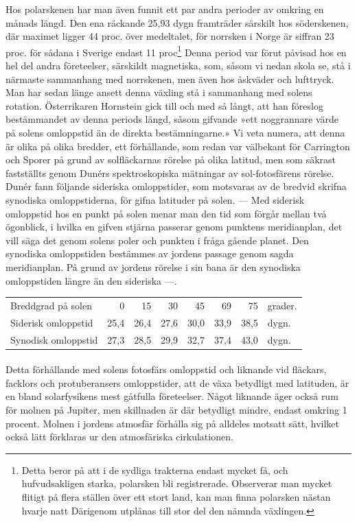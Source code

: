 \documentclass[a4paper, 12pt, oneside, swedish]{article}
\begin{document}
Hos polarskenen har man även funnit ett par andra perioder av omkring en månads längd. Den ena räckande 25,93 dygn framträder särskilt hos söderskenen, där maximet ligger 44 proc. över medeltalet, för norrsken i Norge är siffran 23 proc. för sådana i Sverige endast 11 proc\footnote{Detta beror på att i de sydliga trakterna endast mycket få, och hufvudsakligen starka, polarsken bli registrerade. Observerar man mycket flitigt på flera ställen över ett stort land, kan man finna polarsken nästan hvarje natt Därigenom utplånas till stor del den nämnda växlingen.} Denna period var förut påvisad hos en hel del andra företeelser, särskildt magnetiska, som, såsom vi nedan skola se, stå i närmaste sammanhang med norrskenen, men även hos åskväder och lufttryck. Man har sedan länge ansett denna växling stå i sammanhang med solens rotation. Österrikaren Hornstein gick till och med så långt, att han föreslog bestämmandet av denna periods längd, såsom gifvande »ett noggrannare värde på solens omloppstid än de direkta bestämningarne.» Vi veta numera, att denna är olika på olika bredder, ett förhållande, som redan var välbekant för Carrington och Sporer på grund av solfläckarnas rörelse på olika latitud, men som säkrast fastställts genom Dunérs spektroskopiska mätningar av sol-fotosfärens rörelse. Dunér fann följande sideriska omloppstider, som motsvaras av de bredvid skrifna synodiska omloppstiderna, för gifna latituder på solen. --- Med siderisk omloppstid hos en punkt på solen menar man den tid som förgår mellan två ögonblick, i hvilka en gifven stjärna passerar genom punktens meridianplan, det vill säga det genom solens poler och punkten i fråga gående planet. Den synodiska omloppstiden bestämmes av jordens passage genom sagda meridianplan. På grund av jordens rörelse i sin bana är den synodiska omloppstiden längre än den sideriska ---.

\begin{table}[H]
    \centering
    \footnotesize
    \Fontauri
    \begin{tabular}{l r r r r r r l}
        Breddgrad på solen & 0 & 15 & 30 & 45 & 69 & 75 & grader.   \\
        Siderisk omloppstid & 25,4 & 26,4 & 27,6 & 30,0 & 33,9 & 38,5 & dygn.   \\
        Synodisk omloppstid & 27,3 & 28,5 & 29,9 & 32,7 & 37,4 & 43,0 & dygn. \\
    \end{tabular}
\end{table}
\paragraph{}
Detta förhållande med solens fotosfärs omloppstid och liknande vid fläckars, facklors och protuberansers omloppstider, att de växa betydligt med latituden, är en bland solarfysikens mest gåtfulla företeelser. Något liknande äger också rum för molnen på Jupiter, men skillnaden är där betydligt mindre, endast omkring 1 procent. Molnen i jordens atmosfär förhålla sig på alldeles motsatt sätt, hvilket också lätt förklaras ur den atmosfäriska cirkulationen.
\end{document}
